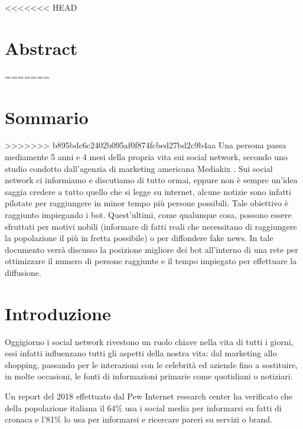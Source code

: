 \documentclass[11pt]{article}
\begin{document}
\newcommand{\CC}{C\nolinebreak\hspace{-.05em}\raisebox{.4ex}{\tiny\bf +}\nolinebreak\hspace{-.10em}\raisebox{.4ex}{\tiny\bf +}}
\def\CC{{C\nolinebreak[4]\hspace{-.05em}\raisebox{.4ex}{\tiny\bf ++}}}

\tableofcontents

\newpage

<<<<<<< HEAD
\section{Abstract}

=======
\section{Sommario}
>>>>>>> b895bdc6c2402b095af0f874fcbed27bd2c9b4aa
Una persona passa mediamente 5 anni e 4 mesi della propria vita sui social network, secondo uno studio condotto dall'agenzia di marketing americana Mediakix \cite{mediakix}. Sui social network ci informiamo e discutiamo di tutto ormai, eppure non è sempre un'idea saggia credere a tutto quello che si legge su internet, alcune notizie sono infatti pilotate per raggiungere in minor tempo più persone possibili.
Tale obiettivo è raggiunto impiegando i bot. Quest’ultimi, come qualunque cosa, possono essere sfruttati per motivi nobili (informare di fatti reali che necessitano di raggiungere la popolazione il più in fretta possibile) o per diffondere fake news.
In tale documento verrà discusso la posizione migliore dei bot all’interno di una rete per ottimizzare il numero di persone raggiunte e il tempo impiegato per effettuare la diffusione.

\section{Introduzione}

Oggigiorno i social network rivestono un ruolo chiave nella vita di tutti i giorni, essi infatti influenzano tutti gli aspetti della nostra vita: dal marketing allo shopping, passando per le interazioni con le celebrità ed aziende fino a sostituire, in molte occasioni, le fonti di informazioni primarie come quotidiani o notiziari.

Un report del 2018 effettuato dal Pew Internet research center \cite{ReportPewInternetResearch2018} ha verificato che della popolazione italiana il 64\% usa i social media per informarsi su fatti di cronaca e l’81\% lo usa per informarsi e ricercare pareri su servizi o brand.
\end{document}
